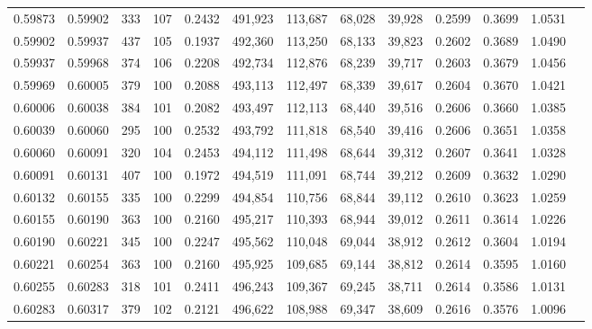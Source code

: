 \begin{tabular}{rrrrrrrrrrrrr}
0.59873 & 0.59902 &   333 & 107 &                                     0.2432 & 491,923 & 113,687 &  68,028 &  39,928 & 0.2599 & 0.3699 & 1.0531 \\
0.59902 & 0.59937 &   437 & 105 &                                     0.1937 & 492,360 & 113,250 &  68,133 &  39,823 & 0.2602 & 0.3689 & 1.0490 \\
0.59937 & 0.59968 &   374 & 106 &                                     0.2208 & 492,734 & 112,876 &  68,239 &  39,717 & 0.2603 & 0.3679 & 1.0456 \\
0.59969 & 0.60005 &   379 & 100 &                                     0.2088 & 493,113 & 112,497 &  68,339 &  39,617 & 0.2604 & 0.3670 & 1.0421 \\
0.60006 & 0.60038 &   384 & 101 &                                     0.2082 & 493,497 & 112,113 &  68,440 &  39,516 & 0.2606 & 0.3660 & 1.0385 \\
0.60039 & 0.60060 &   295 & 100 &                                     0.2532 & 493,792 & 111,818 &  68,540 &  39,416 & 0.2606 & 0.3651 & 1.0358 \\
0.60060 & 0.60091 &   320 & 104 &                                     0.2453 & 494,112 & 111,498 &  68,644 &  39,312 & 0.2607 & 0.3641 & 1.0328 \\
0.60091 & 0.60131 &   407 & 100 &                                     0.1972 & 494,519 & 111,091 &  68,744 &  39,212 & 0.2609 & 0.3632 & 1.0290 \\
0.60132 & 0.60155 &   335 & 100 &                                     0.2299 & 494,854 & 110,756 &  68,844 &  39,112 & 0.2610 & 0.3623 & 1.0259 \\
0.60155 & 0.60190 &   363 & 100 &                                     0.2160 & 495,217 & 110,393 &  68,944 &  39,012 & 0.2611 & 0.3614 & 1.0226 \\
0.60190 & 0.60221 &   345 & 100 &                                     0.2247 & 495,562 & 110,048 &  69,044 &  38,912 & 0.2612 & 0.3604 & 1.0194 \\
0.60221 & 0.60254 &   363 & 100 &                                     0.2160 & 495,925 & 109,685 &  69,144 &  38,812 & 0.2614 & 0.3595 & 1.0160 \\
0.60255 & 0.60283 &   318 & 101 &                                     0.2411 & 496,243 & 109,367 &  69,245 &  38,711 & 0.2614 & 0.3586 & 1.0131 \\
0.60283 & 0.60317 &   379 & 102 &                                     0.2121 & 496,622 & 108,988 &  69,347 &  38,609 & 0.2616 & 0.3576 & 1.0096 \\

\end{tabular}

